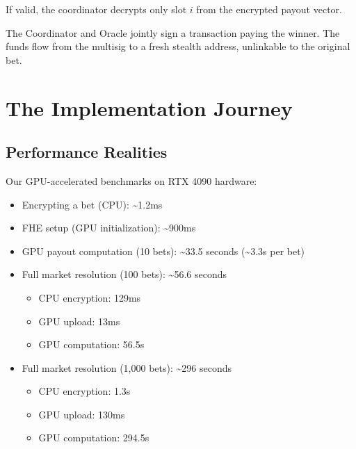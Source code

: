 \documentclass{article}
\begin{document}
If valid, the coordinator decrypts only slot $i$ from the encrypted payout vector.

The Coordinator and Oracle jointly sign a transaction paying the winner. The funds flow from the multisig to a fresh stealth address, unlinkable to the original bet.

\section{The Implementation Journey}

\subsection{Performance Realities}

Our GPU-accelerated benchmarks on RTX 4090 hardware:

\begin{itemize}
\item Encrypting a bet (CPU): \textasciitilde{}1.2ms

\item FHE setup (GPU initialization): \textasciitilde{}900ms

\item GPU payout computation (10 bets): \textasciitilde{}33.5 seconds (\textasciitilde{}3.3s per bet)

\item Full market resolution (100 bets): \textasciitilde{}56.6 seconds

\begin{itemize}
\item CPU encryption: 129ms

\item GPU upload: 13ms

\item GPU computation: 56.5s

\end{itemize}

\item Full market resolution (1,000 bets): \textasciitilde{}296 seconds

\begin{itemize}
\item CPU encryption: 1.3s

\item GPU upload: 130ms

\item GPU computation: 294.5s

\end{itemize}

\end{itemize}
\end{document}
